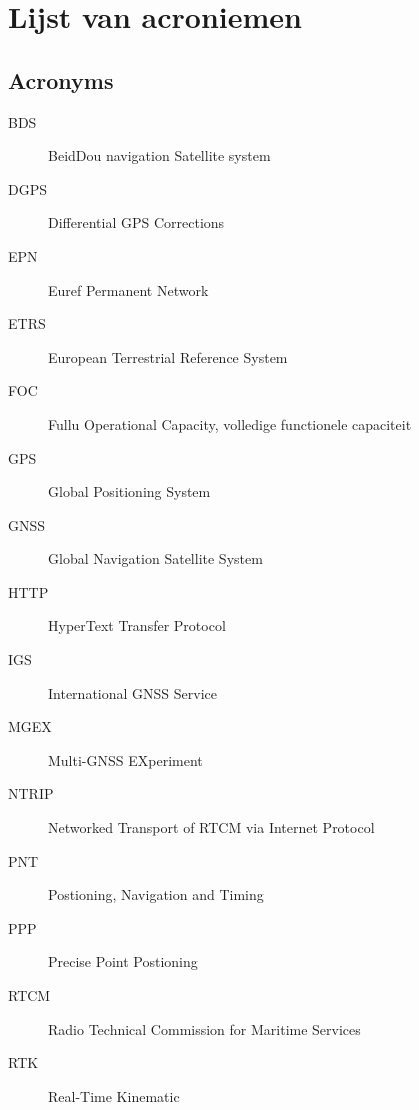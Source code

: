 \chapter*{Lijst van acroniemen}

\section*{Acronyms}
\begin{description}
	\item[BDS] BeidDou navigation Satellite system
	\item[DGPS] Differential GPS Corrections
	\item[EPN] Euref Permanent Network
	\item[ETRS] European Terrestrial Reference System
	\item[FOC] Fullu Operational Capacity, volledige functionele capaciteit
	\item[GPS] Global Positioning System
	\item[GNSS] Global Navigation Satellite System
	\item[HTTP] HyperText Transfer Protocol
	\item[IGS] International GNSS Service
	\item[MGEX] Multi-GNSS EXperiment
	\item[NTRIP] Networked Transport of RTCM via Internet Protocol
	\item[PNT] Postioning, Navigation and Timing
	\item[PPP] Precise Point Postioning
	\item[RTCM] Radio Technical Commission for Maritime Services
	\item [RTK] Real-Time Kinematic
\end{description}

